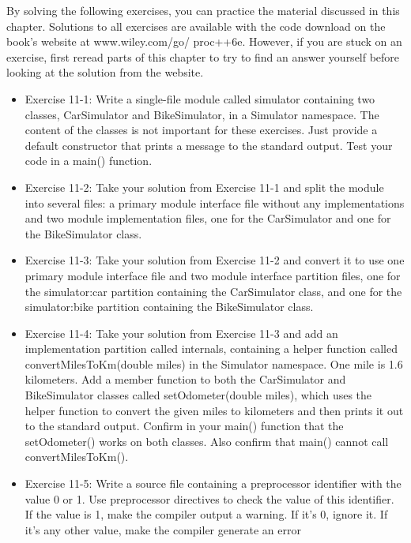 By solving the following exercises, you can practice the material discussed in this chapter. Solutions to all exercises are available with the code download on the book’s website at www.wiley.com/go/ proc++6e. However, if you are stuck on an exercise, first reread parts of this chapter to try to find an answer yourself before looking at the solution from the website.

\begin{itemize}
\item
Exercise 11-1: Write a single-file module called simulator containing two classes, CarSimulator and BikeSimulator, in a Simulator namespace. The content of the classes is not important for these exercises. Just provide a default constructor that prints a message to the standard output. Test your code in a main() function.

\item
Exercise 11-2: Take your solution from Exercise 11-1 and split the module into several files: a primary module interface file without any implementations and two module implementation files, one for the CarSimulator and one for the BikeSimulator class.

\item
Exercise 11-3: Take your solution from Exercise 11-2 and convert it to use one primary module interface file and two module interface partition files, one for the simulator:car partition containing the CarSimulator class, and one for the simulator:bike partition containing the BikeSimulator class.

\item
Exercise 11-4: Take your solution from Exercise 11-3 and add an implementation partition called internals, containing a helper function called convertMilesToKm(double miles) in the Simulator namespace. One mile is 1.6 kilometers. Add a member function to both the CarSimulator and BikeSimulator classes called setOdometer(double miles), which uses the helper function to convert the given miles to kilometers and then prints it out to the standard output. Confirm in your main() function that the setOdometer() works on both classes. Also confirm that main() cannot call convertMilesToKm().

\item
Exercise 11-5: Write a source file containing a preprocessor identifier with the value 0 or 1. Use preprocessor directives to check the value of this identifier. If the value is 1, make the compiler output a warning. If it’s 0, ignore it. If it’s any other value, make the compiler generate an error
\end{itemize}













